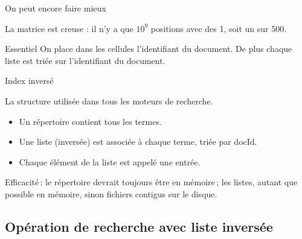 \begin{frame}{On peut encore faire mieux}

La matrice est \alert{creuse} : il n'y a que $10^9$ positions avec des 1, soit un sur 500.

\vfill



\vfill

\begin{blocgauche}
\begin{defblock}{Essentiel}
On place dans les cellules \alert{l'identifiant} du document. De plus chaque liste est
\alert{triée} sur l'identifiant du document.
\end{defblock}

\end{blocgauche}
\end{frame}

\begin{frame}{Index inversé}

La structure utilisée dans \alert{tous}  les moteurs de recherche.

\begin{itemize}
 \item Un \alert{répertoire} contient tous les \alert{termes}.
 \item Une \alert{liste} (inversée) est associée à chaque \alert{terme}, \alert{triée} par docId.
 \item  Chaque élément de la liste est appelé une \alert{entrée}.
\end{itemize}

\vfill




\begin{blocgauche}
\alert{Efficacité}\,: le répertoire devrait toujours être en mémoire\,; les listes, autant que possible en mémoire, sinon
fichiers contigus sur le disque.
\end{blocgauche}
\end{frame}

\subsection{Opération de recherche avec liste inversée}

